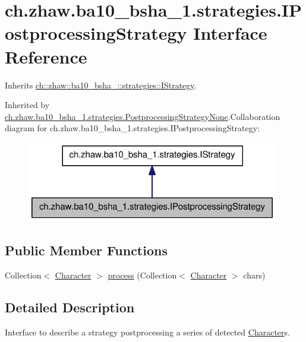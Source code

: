\hypertarget{interfacech_1_1zhaw_1_1ba10__bsha__1_1_1strategies_1_1IPostprocessingStrategy}{
\section{ch.zhaw.ba10\_\-bsha\_\-1.strategies.IPostprocessingStrategy Interface Reference}
\label{interfacech_1_1zhaw_1_1ba10__bsha__1_1_1strategies_1_1IPostprocessingStrategy}
}


Inherits \hyperlink{interfacech_1_1zhaw_1_1ba10__bsha__1_1_1strategies_1_1IStrategy}{ch::zhaw::ba10\_\-bsha\_::strategies::IStrategy}.

Inherited by \hyperlink{classch_1_1zhaw_1_1ba10__bsha__1_1_1strategies_1_1PostprocessingStrategyNone}{ch.zhaw.ba10\_\-bsha\_\-1.strategies.PostprocessingStrategyNone}.Collaboration diagram for ch.zhaw.ba10\_\-bsha\_\-1.strategies.IPostprocessingStrategy:\nopagebreak
\begin{figure}[H]
\begin{center}
\leavevmode
\includegraphics[width=312pt]{interfacech_1_1zhaw_1_1ba10__bsha__1_1_1strategies_1_1IPostprocessingStrategy__coll__graph}
\end{center}
\end{figure}
\subsection*{Public Member Functions}
\begin{DoxyCompactItemize}
\item 
Collection$<$ \hyperlink{classch_1_1zhaw_1_1ba10__bsha__1_1_1Character}{Character} $>$ \hyperlink{interfacech_1_1zhaw_1_1ba10__bsha__1_1_1strategies_1_1IPostprocessingStrategy_a0bb435d4c5cb8ce3b3909ad81961d912}{process} (Collection$<$ \hyperlink{classch_1_1zhaw_1_1ba10__bsha__1_1_1Character}{Character} $>$ chars)
\end{DoxyCompactItemize}


\subsection{Detailed Description}
Interface to describe a strategy postprocessing a series of detected \hyperlink{classch_1_1zhaw_1_1ba10__bsha__1_1_1Character}{Character}s.

